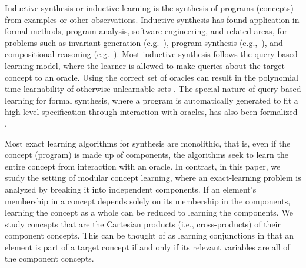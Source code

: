 
Inductive synthesis or inductive learning 
is the synthesis of programs (concepts) from examples or other observations. 
Inductive synthesis has found application in formal methods, program analysis,
software engineering, and related areas, for problems such as 
invariant generation (e.g.~\cite{garg2014ice}),
program synthesis (e.g.,~\cite{solar2006combinatorial}),
and compositional reasoning (e.g.~\cite{cobleigh2003learning}).
Most inductive synthesis follows the query-based learning model, where the
learner is allowed to make queries about the target concept to an oracle. 
Using the correct set of oracles can result in the polynomial time learnability of otherwise unlearnable sets \cite{angluin1988queries}. 
The special nature of query-based learning for formal synthesis, where a program is automatically generated to fit a high-level specification through interaction with oracles,
has also been formalized \cite{jha2017theory}. 

Most exact learning algorithms for synthesis are monolithic, that is, even
if the concept (program) is made up of components, the algorithms seek to
learn the entire concept from interaction with an oracle.
In contrast, in this paper, we study the setting of modular concept learning,
where an exact-learning problem is analyzed by breaking it into independent components. 
If an element's membership in a concept depends solely on its membership in the components, learning the concept as a whole can be reduced to learning the components. 
We study concepts that are the Cartesian products (i.e., cross-products) of their component concepts.  
This can be thought of as learning conjunctions in that an element is part of a target concept if and only if its relevant variables are all of the component concepts. 

